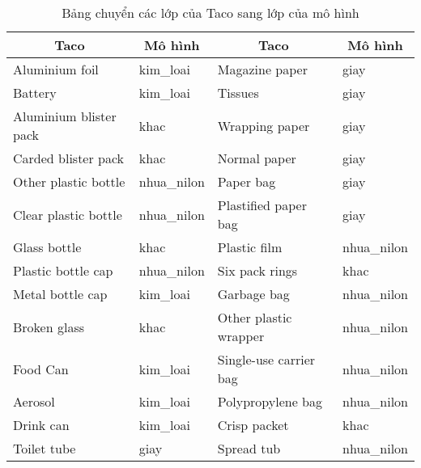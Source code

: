 \documentclass[../the.tex]{subfiles}
\begin{document}
\begin{table}[!ht]
	\centering
	\caption{Bảng chuyển các lớp của Taco sang lớp của mô hình}
	\begin{tabular}{|l|l|l|l|}
		\hline
		\multicolumn{1}{|c|}{\textbf{Taco}}
		                       & \multicolumn{1}{c|}{\textbf{Mô hình}}
		                       & \multicolumn{1}{c|}{\textbf{Taco}}
		                       & \multicolumn{1}{c|}{\textbf{Mô hình}}                                           \\
		\hline
		Aluminium foil         & kim\_loai                             & Magazine paper            & giay        \\ \hline
		Battery                & kim\_loai                             & Tissues                   & giay        \\ \hline
		Aluminium blister pack & khac                                  & Wrapping paper            & giay        \\ \hline
		Carded blister pack    & khac                                  & Normal paper              & giay        \\ \hline
		Other plastic bottle   & nhua\_nilon                           & Paper bag                 & giay        \\ \hline
		Clear plastic bottle   & nhua\_nilon                           & Plastified paper bag      & giay        \\ \hline
		Glass bottle           & khac                                  & Plastic film              & nhua\_nilon \\ \hline
		Plastic bottle cap     & nhua\_nilon                           & Six pack rings            & khac        \\ \hline
		Metal bottle cap       & kim\_loai                             & Garbage bag               & nhua\_nilon \\ \hline
		Broken glass           & khac                                  & Other plastic wrapper     & nhua\_nilon \\ \hline
		Food Can               & kim\_loai                             & Single-use carrier bag    & nhua\_nilon \\ \hline
		Aerosol                & kim\_loai                             & Polypropylene bag         & nhua\_nilon \\ \hline
		Drink can              & kim\_loai                             & Crisp packet              & khac        \\ \hline
		Toilet tube            & giay                                  & Spread tub                & nhua\_nilon \\ \hline

\end{tabular}
\end{table}
\end{document}
